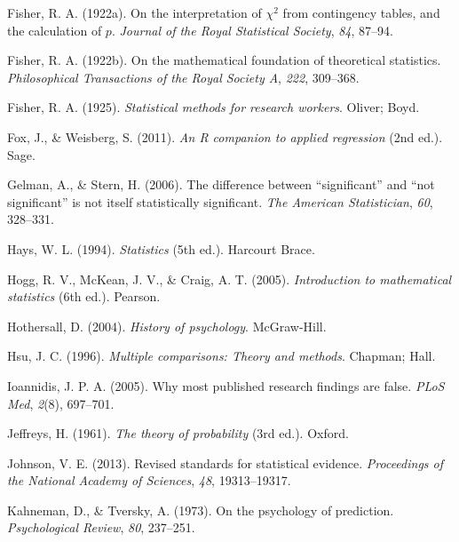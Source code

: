 \documentclass[
]{book}
\newlength{\cslhangindent}
\newlength{\cslentryspacingunit} %
\newenvironment{CSLReferences}[2] %
 {%
  \setlength{\parindent}{0pt}
  \ifodd #1
  \let\oldpar\par
  \def\par{\hangindent=\cslhangindent\oldpar}
  \fi
  \setlength{\parskip}{#2\cslentryspacingunit}
 }%
 {}
\theoremstyle{definition}
\theoremstyle{definition}
\theoremstyle{definition}
\theoremstyle{definition}
\theoremstyle{remark}
\begin{document}
\begin{CSLReferences}{1}{0}
\leavevmode{}%
Fisher, R. A. (1922a). On the interpretation of \(\chi^2\) from contingency tables, and the calculation of \(p\). \emph{Journal of the Royal Statistical Society}, \emph{84}, 87--94.

\leavevmode{}%
Fisher, R. A. (1922b). On the mathematical foundation of theoretical statistics. \emph{Philosophical Transactions of the Royal Society A}, \emph{222}, 309--368.

\leavevmode{}%
Fisher, R. A. (1925). \emph{Statistical methods for research workers}. Oliver; Boyd.

\leavevmode{}%
Fox, J., \& Weisberg, S. (2011). \emph{An {R} companion to applied regression} (2nd ed.). Sage.

\leavevmode{}%
Gelman, A., \& Stern, H. (2006). The difference between {``significant''} and {``not significant''} is not itself statistically significant. \emph{The American Statistician}, \emph{60}, 328--331.

\leavevmode{}%
Hays, W. L. (1994). \emph{Statistics} (5th ed.). Harcourt Brace.

\leavevmode{}%
Hogg, R. V., McKean, J. V., \& Craig, A. T. (2005). \emph{Introduction to mathematical statistics} (6th ed.). Pearson.

\leavevmode{}%
Hothersall, D. (2004). \emph{History of psychology}. McGraw-Hill.

\leavevmode{}%
Hsu, J. C. (1996). \emph{Multiple comparisons: Theory and methods}. Chapman; Hall.

\leavevmode{}%
Ioannidis, J. P. A. (2005). Why most published research findings are false. \emph{PLoS Med}, \emph{2}(8), 697--701.

\leavevmode{}%
Jeffreys, H. (1961). \emph{The theory of probability} (3rd ed.). Oxford.

\leavevmode{}%
Johnson, V. E. (2013). Revised standards for statistical evidence. \emph{Proceedings of the National Academy of Sciences}, \emph{48}, 19313--19317.

\leavevmode{}%
Kahneman, D., \& Tversky, A. (1973). On the psychology of prediction. \emph{Psychological Review}, \emph{80}, 237--251.


\end{CSLReferences}
\end{document}
